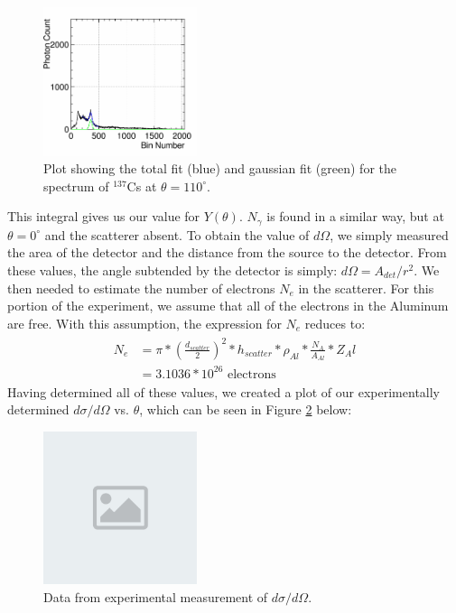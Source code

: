 \documentclass[%
 reprint,
 amsmath,amssymb,
 aps,
 pra,
]{revtex4-1}
\begin{document}
\begin{figure}[H]
	\centering
	\includegraphics[width=0.4\textwidth]{GaussianPortion.png}
	\caption{Plot showing the total fit (blue) and gaussian fit (green) for the spectrum of $^{137}$Cs at $\theta = 110^\circ$.}
	\label{GaussianPortion}
\end{figure}

This integral gives us our value for $Y(\theta)$. $N_\gamma$ is found in a similar way, but at $\theta = 0^\circ$ and the scatterer absent. To obtain the value of $d\Omega$, we simply measured the area of the detector and the distance from the source to the detector. From these values, the angle subtended by the detector is simply: $d\Omega = A_{det}/r^2$. We then needed to estimate the number of electrons $N_e$ in the scatterer. For this portion of the experiment, we assume that all of the electrons in the Aluminum are free. With this assumption, the expression for $N_e$ reduces to:
\begin{gather}
	\begin{split}
		N_e 		& = \pi*\left(\frac{d_{scatter}}{2}\right)^2*h_{scatter}*\rho_{Al}*\frac{N_A}{A_{Al}}*Z_Al \\
				& = 3.1036*10^{26} \text{ electrons}
	\end{split} \nonumber
\end{gather}
\noindent Having determined all of these values, we created a plot of our experimentally determined $d\sigma / d\Omega$ vs. $\theta$, which can be seen in Figure \ref{KN} below:

\begin{figure}[H]
	\centering
	\includegraphics[width=0.4\textwidth]{placeholder.png}
	\caption{Data from experimental measurement of $d\sigma/d\Omega$.}
	\label{KN}
\end{figure}
\end{document}

